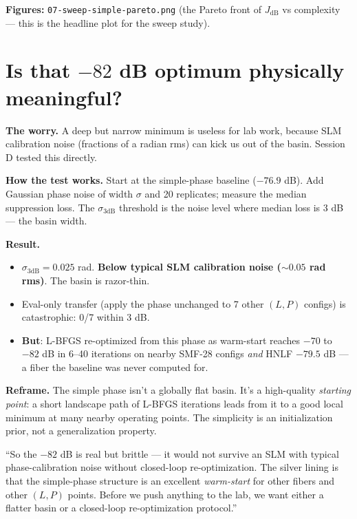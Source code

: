 \documentclass[11pt,letterpaper]{article}
\begin{document}
\textbf{Figures:} \texttt{07-sweep-simple-pareto.png} (the Pareto front of $J_{\mathrm{dB}}$ vs complexity --- this is the headline plot for the sweep study).

\section{Is that $-82$ dB optimum physically meaningful?}

\textbf{The worry.} A deep but narrow minimum is useless for lab work, because SLM calibration noise (fractions of a radian rms) can kick us out of the basin. Session D tested this directly.

\textbf{How the test works.} Start at the simple-phase baseline ($-76.9$ dB). Add Gaussian phase noise of width $\sigma$ and 20 replicates; measure the median suppression loss. The $\sigma_{3\mathrm{dB}}$ threshold is the noise level where median loss is 3 dB --- the basin width.

\textbf{Result.}
\begin{itemize}[leftmargin=*]
  \item $\sigma_{3\mathrm{dB}} = 0.025$ rad. \textbf{Below typical SLM calibration noise ($\sim 0.05$ rad rms)}. The basin is razor-thin.
  \item Eval-only transfer (apply the phase unchanged to 7 other $(L,P)$ configs) is catastrophic: 0/7 within 3 dB.
  \item \textbf{But}: L-BFGS re-optimized from this phase as warm-start reaches $-70$ to $-82$ dB in 6--40 iterations on nearby SMF-28 configs \emph{and} HNLF $-79.5$ dB --- a fiber the baseline was never computed for.
\end{itemize}

\textbf{Reframe.} The simple phase isn't a globally flat basin. It's a high-quality \emph{starting point}: a short landscape path of L-BFGS iterations leads from it to a good local minimum at many nearby operating points. The simplicity is an initialization prior, not a generalization property.

\begin{say}
``So the $-82$ dB is real but brittle --- it would not survive an SLM with typical phase-calibration noise without closed-loop re-optimization. The silver lining is that the simple-phase structure is an excellent \emph{warm-start} for other fibers and other $(L, P)$ points. Before we push anything to the lab, we want either a flatter basin or a closed-loop re-optimization protocol.''
\end{say}
\end{document}

